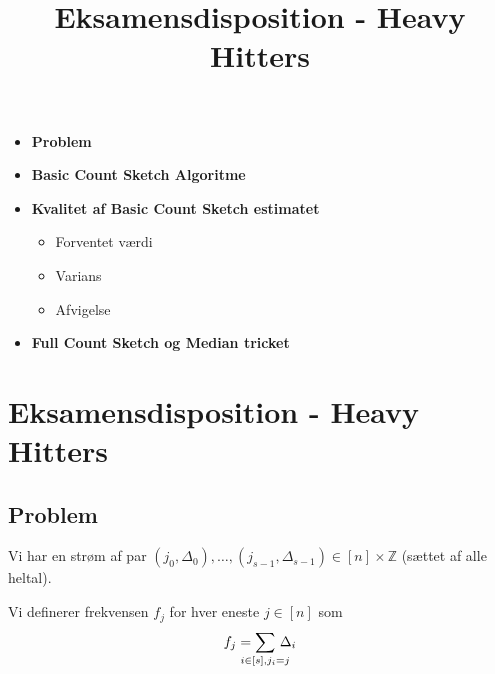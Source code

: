 
\title{Eksamensdisposition - Heavy Hitters}


\maketitle

\begin{itemize}
  \item \textbf{Problem}
  \item \textbf{Basic Count Sketch Algoritme}
  \item \textbf{Kvalitet af Basic Count Sketch estimatet}
  \begin{itemize}
    \item Forventet værdi
    \item Varians
    \item Afvigelse
  \end{itemize}
  \item \textbf{Full Count Sketch og Median tricket}
\end{itemize}


\newpage
\section{Eksamensdisposition - Heavy Hitters}

\subsection{Problem}

Vi har en strøm af par $(j_0, \Delta_0), \dots, (j_{s-1}, \Delta_{s-1}) \in [n]\times \mathbb Z$ (sættet af alle heltal).

Vi definerer frekvensen $f_j$ for hver eneste $j \in [n]$ som
$$
f_j = \summ{i \in [s], j_i = j} \, \Delta_i
$$

